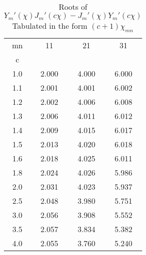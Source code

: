 \begin{table}[htbp]
\begin{center}
\begin{tabular}{| c | c | c | c |}
\hline
mn & 11 & 21 & 31 \\ 
c &  &  &  \\ 
\hline
1.0 & 2.000 & 4.000 & 6.000 \\ 
1.1 & 2.001 & 4.001 & 6.002 \\ 
1.2 & 2.002 & 4.006 & 6.008 \\ 
1.3 & 2.006 & 4.011 & 6.012 \\ 
1.4 & 2.009 & 4.015 & 6.017 \\ 
1.5 & 2.013 & 4.020 & 6.018 \\ 
1.6 & 2.018 & 4.025 & 6.011 \\ 
1.8 & 2.024 & 4.026 & 5.986 \\ 
2.0 & 2.031 & 4.023 & 5.937 \\ 
2.5 & 2.048 & 3.980 & 5.751 \\ 
3.0 & 2.056 & 3.908 & 5.552 \\ 
3.5 & 2.057 & 3.834 & 5.382 \\ 
4.0 & 2.055 & 3.760 & 5.240 \\ 
\hline
\end{tabular}
\caption{ \centering Roots of $Y_m'(\chi) J_m'(c \chi) - J_m'(\chi) Y_m'(c \chi)$ \\
Tabulated in the form $(c+1)\chi_{mn}$}
\label{tab:TE-chi-1}
\end{center}
\end{table}
